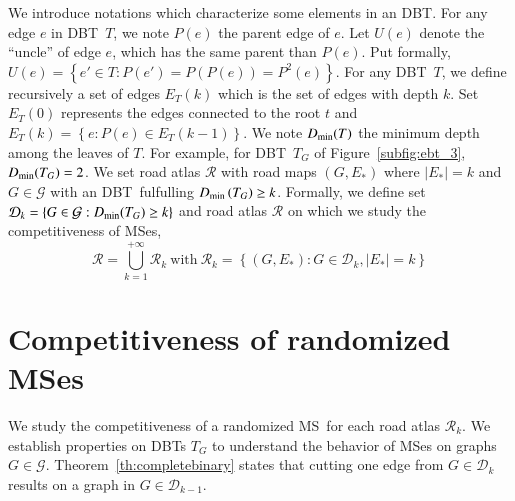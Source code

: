 \documentclass[preprint]{elsarticle}
\newcommand{\set}[1]{\left\{ #1 \right\}}
\newcommand{\card}[1]{\left| #1 \right|}
\newcommand{\mcalg}{\mathcal{G}}
\newcommand{\mcalr}{\mathcal{R}}
\newcommand{\mcald}{\mathcal{D}}
\newcommand{\mts}{MS}
\newcommand{\ebt}{DBT}
\newcommand{\dmin}{D_{\mbox{\scriptsize{min}}}}
\begin{document}
We introduce notations which characterize some elements in an \ebt . For any edge $e$ in \ebt ~$T$, we note $P(e)$ the parent edge of $e$. Let $U(e)$ denote the ``uncle'' of edge $e$, which has the same parent than $P(e)$. Put formally, $U(e) = \set{e' \in T : P(e') = P\left(P(e)\right) = P^2(e)}$. For any \ebt ~$T$, we define recursively a set of edges $E_T(k)$ which is the set of edges with depth $k$. Set $E_T(0)$ represents the edges connected to the root $t$ and $E_T(k) = \set{e : P(e) \in E_T(k-1)}$. We note $\dmin(T)$ the minimum depth among the leaves of $T$. For example, for \ebt ~$T_G$ of Figure~\ref{subfig:ebt_3}, $\dmin(T_G) = 2$. We set road atlas $\mcalr$ with road maps $\left(G,E_*\right)$ where $\card{E_*} = k$ and $G \in \mcalg$ with an \ebt ~fulfulling $\dmin\left(T_G\right) \geq k$. Formally, we define set $\mcald_k = \set{G \in \mcalg : \dmin(T_G) \geq k}$ and road atlas $\mcalr$ on which we study the competitiveness of \mts es,
\[
\mcalr = \bigcup\limits_{k=1}^{+\infty} \mcalr_k ~\mbox{with}~
\mcalr_k = \set{\left(G ,E_*\right): G \in \mcald_k, \card{E_*} = k}
\]

\section{Competitiveness of randomized \mts es} \label{sec:competitiveness}

We study the competitiveness of a randomized \mts ~for each road atlas $\mcalr_k$. We establish properties on \ebt s $T_G$ to understand the behavior of \mts es on graphs $G \in \mcalg$. Theorem~\ref{th:completebinary} states that cutting one edge from $G \in \mcald_k$ results on a graph in $G \in \mcald_{k-1}$.
\end{document}
